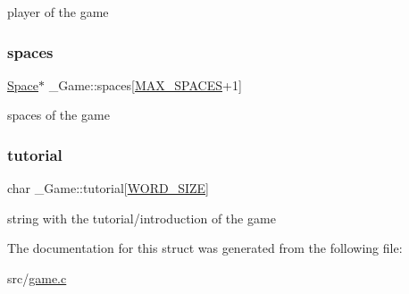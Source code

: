 player of the game \mbox{\label{struct__Game_ab4180417d9148f8abb2233ca6c4ecfe5}} 
\subsubsection{\texorpdfstring{spaces}{spaces}}
{\footnotesize\ttfamily \hyperlink{space_8h_a67533ffc2b70463baecc38fb0629bbfc}{Space}$\ast$ \+\_\+\+Game\+::spaces\mbox{[}\hyperlink{space_8h_a5f54fd55f983a2e33ce076cd9f587e82}{M\+A\+X\+\_\+\+S\+P\+A\+C\+ES}+1\mbox{]}}

spaces of the game \mbox{\label{struct__Game_a515c9531e4c918cd117ac503cf513076}} 
\subsubsection{\texorpdfstring{tutorial}{tutorial}}
{\footnotesize\ttfamily char \+\_\+\+Game\+::tutorial\mbox{[}\hyperlink{types_8h_a92ed8507d1cd2331ad09275c5c4c1c89}{W\+O\+R\+D\+\_\+\+S\+I\+ZE}\mbox{]}}

string with the tutorial/introduction of the game 

The documentation for this struct was generated from the following file\+:\begin{DoxyCompactItemize}
\item 
src/\hyperlink{game_8c}{game.\+c}\end{DoxyCompactItemize}
